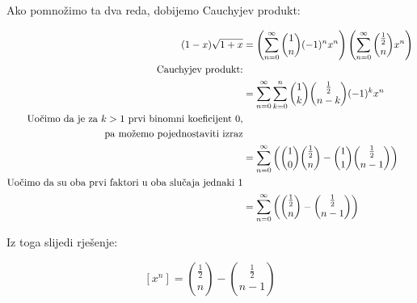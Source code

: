 \documentclass[exam.tex]{subfiles}
\begin{document}
	Ako pomnožimo ta dva reda, dobijemo Cauchyjev produkt:
	
	\begin{align*}
		(1 - x) \sqrt{1 + x} &= \left ( \sum\limits^\infty_{n=0} \binom{1}{n} (-1)^n x^n \right ) \left ( \sum\limits^\infty_{n=0} \binom{\frac{1}{2}}{n} x^n \right ) \\
		\text{Cauchyjev produkt:} \\
		&= \sum\limits^\infty_{n=0} \sum\limits^n_{k=0} \binom{1}{k} \binom{\frac{1}{2}}{n - k} (-1)^k x^n \\
		\text{Uočimo da je za \( k > 1 \) prvi binomni koeficijent 0,} \\
		\text{ pa možemo pojednostaviti izraz} \\
		&= \sum\limits^\infty_{n=0} \left ( \binom{1}{0} \binom{\frac{1}{2}}{n} - \binom{1}{1} \binom{\frac{1}{2}}{n - 1} \right ) \\
		\text{Uočimo da su oba prvi faktori u oba slučaja jednaki 1} \\
		&= \sum\limits^\infty_{n=0} \left ( \binom{\frac{1}{2}}{n} - \binom{\frac{1}{2}}{n - 1} \right ) \\
	\end{align*}
	
	Iz toga slijedi rješenje:
	
	\[ [x^n] = \binom{\frac{1}{2}}{n} - \binom{\frac{1}{2}}{n - 1} \]
\end{document}
